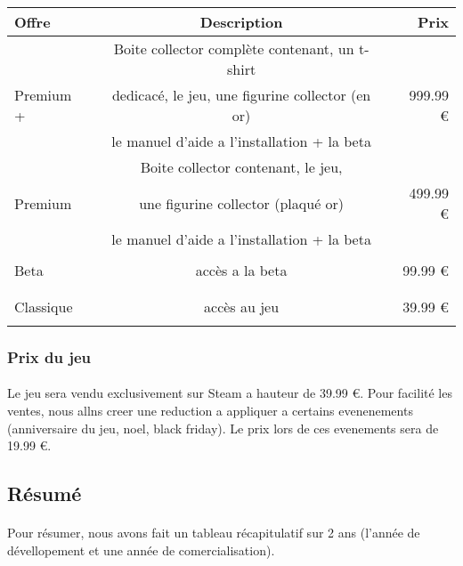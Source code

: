 \documentclass{article}
\begin{document}
\begin{tabular}{| l | c | r |} \hline
   \textbf{Offre} & \textbf{Description} & \textbf{Prix} \\ \hline
    & Boite collector complète contenant, un t-shirt  & \\
   Premium + & dedicacé, le jeu, une figurine collector (en or) & 999.99 € \\ 
    & le manuel d'aide a l'installation + la beta & \\ \hline
     & Boite collector contenant, le jeu,  & \\
   Premium & une figurine collector (plaqué or)& 499.99 € \\ 
    & le manuel d'aide a l'installation + la beta & \\ \hline
    & &  \\
    Beta & accès a la beta& 99.99 € \\
    & & \\ \hline
    & & \\
    Classique & accès au jeu & 39.99 € \\
    & & \\ \hline
\end{tabular}

\subsubsection{Prix du jeu}
\paragraph{} Le jeu sera vendu exclusivement sur Steam a hauteur de 39.99 €. Pour facilité les ventes, nous allns creer une reduction a appliquer a certains evenenements (anniversaire du jeu, noel, black friday). Le prix lors de ces evenements sera de 19.99 €.

\subsection{Résumé}
\paragraph{} Pour résumer, nous avons fait un tableau récapitulatif sur 2 ans (l'année de dévellopement et une année de comercialisation).\\
\end{document}
